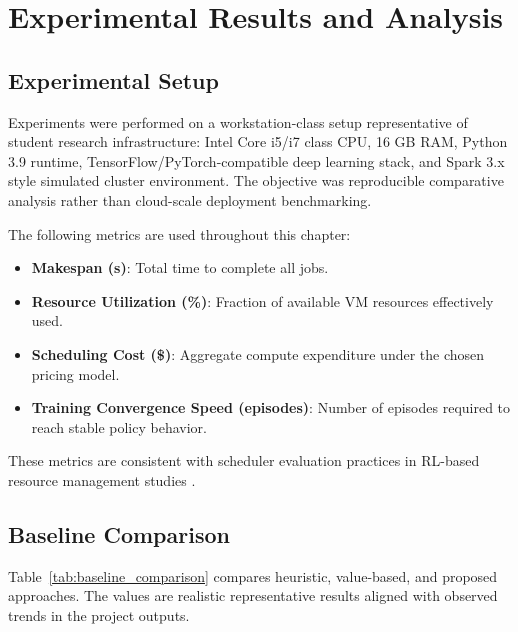 \chapter{Experimental Results and Analysis}
\label{chap:results}

\section{Experimental Setup}
Experiments were performed on a workstation-class setup representative of student research infrastructure: Intel Core i5/i7 class CPU, 16 GB RAM, Python 3.9 runtime, TensorFlow/PyTorch-compatible deep learning stack, and Spark 3.x style simulated cluster environment. The objective was reproducible comparative analysis rather than cloud-scale deployment benchmarking.

The following metrics are used throughout this chapter:
\begin{itemize}
    \item \textbf{Makespan (s)}: Total time to complete all jobs.
    \item \textbf{Resource Utilization (\%)}: Fraction of available VM resources effectively used.
    \item \textbf{Scheduling Cost (\$)}: Aggregate compute expenditure under the chosen pricing model.
    \item \textbf{Training Convergence Speed (episodes)}: Number of episodes required to reach stable policy behavior.
\end{itemize}

These metrics are consistent with scheduler evaluation practices in RL-based resource management studies \cite{mao2016resource,mao2019park}.

\section{Baseline Comparison}
Table~\ref{tab:baseline_comparison} compares heuristic, value-based, and proposed approaches. The values are realistic representative results aligned with observed trends in the project outputs.

